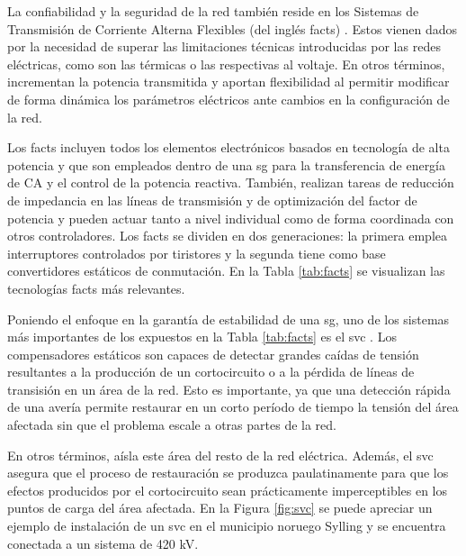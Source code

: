 \vspace{3mm}

La confiabilidad y la seguridad de la red también reside en los Sistemas de Transmisión de Corriente Alterna Flexibles (del inglés \gls{facts}) \cite{facts} \cite{facts3}. Estos vienen dados por la necesidad de superar las limitaciones técnicas introducidas por las redes eléctricas, como son las térmicas o las respectivas al voltaje. En otros términos, incrementan la potencia transmitida y aportan flexibilidad al permitir modificar de forma dinámica los parámetros eléctricos ante cambios en la configuración de la red. 

\vspace{3mm}

Los \gls{facts} incluyen todos los elementos electrónicos basados en tecnología de alta potencia y que son empleados dentro de una \gls{sg} para la transferencia de energía de CA y el control de la potencia reactiva. También, realizan tareas de reducción de impedancia en las líneas de transmisión y de optimización del factor de potencia y pueden actuar tanto a nivel individual como de forma coordinada con otros controladores. Los \gls{facts} se dividen en dos generaciones: la primera emplea interruptores controlados por tiristores y la segunda tiene como base convertidores estáticos de conmutación. En la Tabla \ref{tab:facts} se visualizan las tecnologías \gls{facts} más relevantes. \cite{facts2} \cite{facts3}

\vspace{3mm}

Poniendo el enfoque en la garantía de estabilidad de una \gls{sg}, uno de los sistemas más importantes de los expuestos en la Tabla \ref{tab:facts} es el \gls{svc} \cite{facts}. Los compensadores estáticos son capaces de detectar grandes caídas de tensión resultantes a la producción de un cortocircuito o a la pérdida de líneas de transisión en un área de la red. Esto es importante, ya que una detección rápida de una avería permite restaurar en un corto período de tiempo la tensión del área afectada sin que el problema escale a otras partes de la red. 

\vspace{3mm}

En otros términos, aísla este área del resto de la red eléctrica. Además, el \gls{svc} asegura que el proceso de restauración se produzca paulatinamente para que los efectos producidos por el cortocircuito sean prácticamente imperceptibles en los puntos de carga del área afectada. En la Figura \ref{fig:svc} se puede apreciar un ejemplo de instalación de un \gls{svc} en el municipio noruego Sylling y se encuentra conectada a un sistema de 420 kV.


